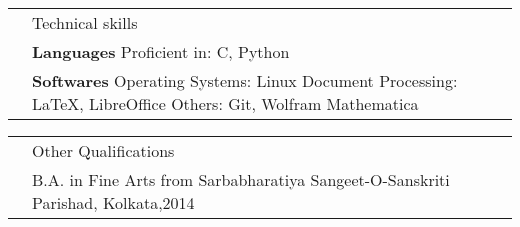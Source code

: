 \documentclass[a4paper, 11pt]{article}
\newcommand{\headingfont}{\Large\color{Bittersweet}}
\newenvironment{SectionTable}[1]{
	\renewcommand*{\arraystretch}{1.7}
	\setlength{\tabcolsep}{10pt}
	\begin{longtable}{Rp{5.2in}} & #1 \\}
{\end{longtable}\vspace{-.3cm}}
\begin{document}















\begin{SectionTable}{\headingfont Technical skills}
& \textbf{Languages} \newline
Proficient in: C, Python \newline
\\ %

& \textbf{Softwares} \newline
Operating Systems: Linux \newline
Document Processing: \LaTeX , LibreOffice\newline
Others: Git, Wolfram Mathematica \\

\end{SectionTable}





\begin{SectionTable}{\headingfont Other Qualifications}
& B.A. in Fine Arts from Sarbabharatiya Sangeet-O-Sanskriti Parishad, Kolkata,2014
\end{SectionTable}
\end{document}
